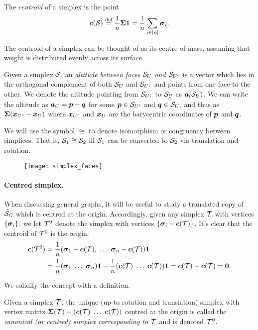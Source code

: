 The \emph{centroid} of a simplex is the point 
\begin{equation}
\label{eq:centroid}
\vb*{c}(\mathcal{S}) \overset{\text{def}}{=} \frac{1}{n}\boldsymbol{\Sigma} \vb{1} = \frac{1}{n}\sum_{i\in[n]}\vb*{\sigma}_i.
\end{equation} 

The centroid of a simplex can be thought of as its centre of mass, assuming that weight is distributed evenly across its surface. 

Given a simplex $\mathcal{S}$, an \emph{altitude between faces $\mathcal{S}_U$ and $\mathcal{S}_{U^c}$} is a vector which lies in the orthogonal complement of both $\mathcal{S}_U$ and $\mathcal{S}_{U^c}$ and points from one face to the other. 
We denote the altitude pointing from $\mathcal{S}_{U^c}$ to $\mathcal{S}_{U}$ as $\vb*{a}_(\mathcal{S}_U)$. We can write the altitude as $\vb*{a}_U=\vb*{p}-\vb*{q}$ for some $\vb*{p}\in \mathcal{S}_{U^c}$ and $\vb*{q}\in\mathcal{S}_{U}$, and thus as $\boldsymbol{\Sigma}(\vb*{x}_{U^c}-\vb*{x}_{U})$ where $\vb*{x}_{U^c}$ and $\vb*{x}_{U}$ are the barycentric coordinates of $\vb*{p}$ and $\vb*{q}$. 

We will use the symbol $\cong$ to denote isomorphism or congruency between simplices. That is, $\mathcal{S}_1\cong\mathcal{S}_2$ iff $\mathcal{S}_1$ can be converted to $\mathcal{S}_2$ via translation and rotation.  

\begin{figure}
	\centering
	\texttt{[image: simplex\_faces]}
	\caption{}
	\label{fig:simplex_faces}
\end{figure}

\paragraph{Centred  simplex.} When discussing general graphs, it will be useful to study a  translated copy of $\widehat{\mathcal{S}}_G$ which is centred at the origin. Accordingly, given any simplex $\mathcal{T}$ with vertices $\{\vb*{\sigma}_i\}$, we let $\mathcal{T}^0$ denote the simplex with vertices $\{\vb*{\sigma}_i - \vb*{c}(\mathcal{T})\}$. It's clear that the centroid of $\mathcal{T}^0$ is the origin: 
\begin{align*}
\vb*{c}(\mathcal{T}^0) 
&= \frac{1}{n}(\vb*{\sigma}_1-\vb*{c}(\mathcal{T}),\;\dots\;\vb*{\sigma}_n-\vb*{c}(\mathcal{T}))\vb{1} \\
&= \frac{1}{n}(\vb*{\sigma}_1\;\dots\;\vb*{\sigma}_n)\vb{1} - \frac{1}{n}(\vb*{c}(\mathcal{T})\;\dots\;\vb*{c}(\mathcal{T}))\vb{1} = \vb*{c}(\mathcal{T}) - \vb*{c}(\mathcal{T})=\vb{0}.
\end{align*}

We solidify the concept with a definition. 

\begin{definition}
	Given a simplex $\mathcal{T}$, the unique (up to rotation and translation) simplex with vertex matrix $\boldsymbol{\Sigma}(\mathcal{T}) - (\vb*{c}(\mathcal{T})\;\dots\;\vb*{c}(\mathcal{T}))$ centred at the origin is called the \emph{canonical (or centred) simplex corresponding to $\mathcal{T}$} and is denoted $\mathcal{T}^0$. 
\end{definition}

